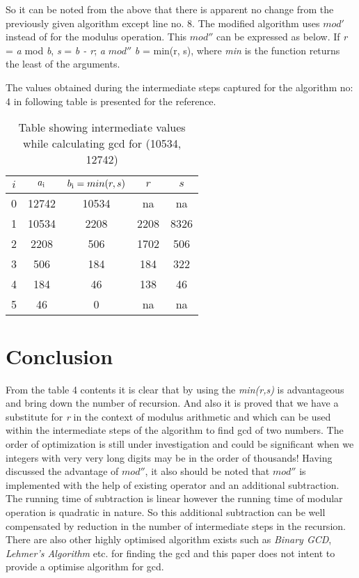 \documentclass[conference,compsoc]{IEEEtran}
\newcommand{\var}[1]{\textit{#1}}
\renewcommand{\mod}{\text{mod}}
\begin{document}
So it can be noted from the above that there is apparent no change from the previously given algorithm except line no. 8. The modified algorithm uses $mod'$ instead of \mod for the modulus operation. This $mod''$ can be expressed as below.
If \textit{r} = \textit{a} mod \textit{b}, \textit{s} = \textit{b - r};
\textit{a} $mod''$ \textit{b} = min(r, s), where \textit{min} is the function returns the least of the arguments.

The values obtained during the intermediate steps captured for the algorithm no: 4 in following table is presented for the reference.
\begin{table}[!htbp]
\caption{Table showing intermediate values while calculating gcd for (10534, 12742)}
\label{table:4}
\centering
	\begin{tabular}{c | c | c | c| c}
	\hline
	$i$ & $a\textsubscript{i}$ & $b\textsubscript{i} = min(r,s)$ & $r$ & $s$\\ [0.5ex] 
	\hline
		0 & 12742 & 10534 & na   & na \\ 
		1 & 10534 & 2208  & 2208 & 8326\\  
		2 & 2208  & 506   & 1702 & 506\\
		3 & 506   & 184   & 184  & 322\\
		4 & 184   & 46    & 138  & 46\\
		5 & 46    & 0     & na   & na
	\end{tabular}
\end{table}

\section{Conclusion}
From the table 4 contents it is clear that by using the \var{min(r,s)} is advantageous and bring down the number of recursion. And also it is proved that we have a substitute for \var{r} in the context of modulus arithmetic and which can be used within the intermediate steps of the algorithm to find gcd of two numbers. The order of optimization is still under investigation and could be significant when we integers with very very long digits may be in the order of thousands! Having discussed the advantage of $mod''$, it also should be noted that $mod''$ is implemented with the help of existing \mod operator and an additional subtraction. The running time of subtraction is linear however the running time of modular operation is quadratic in nature. So this additional subtraction can be well compensated by reduction in the number of intermediate steps in the recursion. There are also other highly optimised algorithm exists such as \var{Binary GCD}, \var{Lehmer's Algorithm} etc. for finding the gcd and this paper does not intent to provide a optimise algorithm for gcd.
\end{document}
